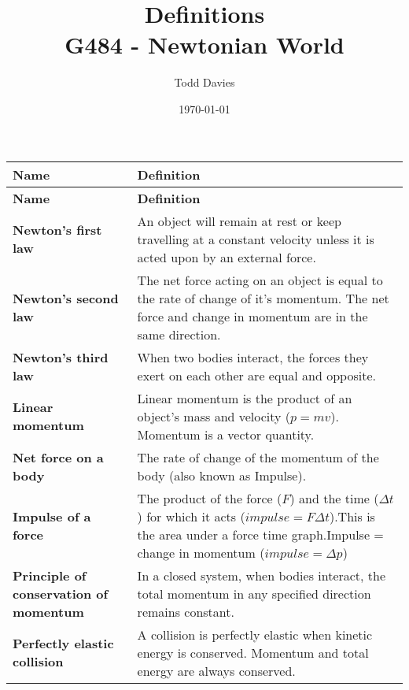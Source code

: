 \documentclass{article}
\title{Definitions \\ \large{G484 - Newtonian World}}
\author{Todd Davies}
\date{\today}
\begin{document}
\lhead{\today}

\maketitle

\thispagestyle{empty}

\begin{longtable}{>{\bf\centering\arraybackslash}p{1in} 
  p{\textwidth-4\tabcolsep-1in}}

\large{Name} & \large{\textbf{Definition}}\\ \midrule
\endfirsthead
\large{Name} & \large{\textbf{Definition}}\\ \midrule
\endhead
\midrule
\multicolumn{2}{r}{continued \ldots}
\endfoot
\endlastfoot
  Newton's first law & An object will remain at rest or keep 
    travelling at a constant velocity unless it is acted upon by an external 
    force.\\ \midrule
  Newton's second law & The net force acting on an object is equal
    to the rate of change of it's momentum. The net force and change in momentum
    are in the same direction.\\ \midrule
  Newton's third law & When two bodies interact, the forces they
    exert on each other are equal and opposite.\\ \midrule
  Linear momentum & Linear momentum is the product of an object's mass and
    velocity ($p=mv$). Momentum is a vector quantity.\\ \midrule
  Net force on a body & The rate of change of the momentum of the body
  (also known as Impulse).\\ \midrule
  Impulse of a force & The product of the force ($F$) and the time ($\Delta t$)
    for which it acts ($impulse = F \Delta t$).\newline \newline This is the
    area under a force time graph.\newline \newline Impulse = change in momentum
    ($impulse = \Delta p$)\\ \midrule
  Principle of conservation of momentum & In a closed system, when bodies
    interact, the total momentum in any specified direction remains constant.\\
    \midrule
  Perfectly elastic collision & A collision is perfectly elastic
    when kinetic energy is conserved. Momentum and total energy are always
    conserved.\\ \midrule

\end{longtable}
\end{document}
